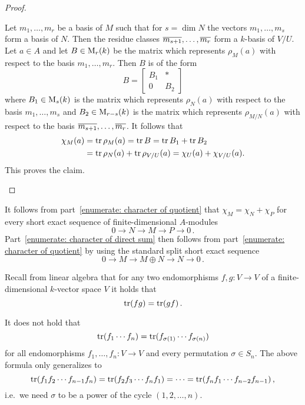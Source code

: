 \begin{proof}
\begin{enumerate}
      Let $m_1, \dotsc, m_r$ be a basis of $M$ such that for $s = \dim N$ the vectors $m_1, \dotsc, m_s$ form a basis of $N$.
      Then the residue classes $\overline{m_{s+1}}, \dotsc, \overline{m_r}$ form a $k$-basis of $V/U$.
      Let $a \in A$ and let $B \in \operatorname{M}_r(k)$ be the matrix which represents $\rho_M(a)$ with respect to the basis $m_1, \dotsc, m_r$.
      Then $B$ is of the form
      \[
          B
        = \begin{bmatrix}
            B_1 & * \\
            0 & B_2
          \end{bmatrix}
      \]
      where $B_1 \in \operatorname{M}_s(k)$ is the matrix which represents $\rho_N(a)$ with respect to the basis $m_1, \dotsc, m_s$ and $B_2 \in \operatorname{M}_{r-s}(k)$ is the matrix which represents $\rho_{M/N}(a)$ with respect to the basis $\overline{m_{s+1}}, \dotsc, \overline{m_r}$.
      It follows that
      \begin{align*}
            \chi_M(a)
        &=  \operatorname{tr} \rho_M(a)
         =  \operatorname{tr} B
         =  \operatorname{tr} B_1 + \operatorname{tr} B_2 \\
        &=  \operatorname{tr} \rho_N(a) + \operatorname{tr} \rho_{V/U}(a)
         =  \chi_U(a) + \chi_{V/U}(a).
      \end{align*}
      This proves the claim.
    \qedhere
  \end{enumerate}
\end{proof}


\begin{remark}
  It follows from part~\ref*{enumerate: character of quotient} that $\chi_M = \chi_N + \chi_P$ for every short exact sequence of finite-dimensional $A$-modules
  \[
        0
    \to N
    \to M
    \to P
    \to 0 \,.
  \]
  Part~\ref*{enumerate: character of direct sum} then follows from part~\ref*{enumerate: character of quotient} by using the standard split short exact sequence
  \[
        0
    \to M
    \to M \oplus N
    \to N
    \to 0 \,.
  \]
\end{remark}


\begin{recall}
  Recall from linear algebra that for any two endomorphisms $f, g \colon V \to V$ of a finite-dimensional $k$-vector space $V$ it holds that
  \[
    \operatorname{tr}(fg) = \operatorname{tr}(gf) \,.
  \]
\end{recall}


\begin{warning}
  It does not hold that
  \[
      \operatorname{tr}(f_1 \dotsm f_n)
    = \operatorname{tr}(f_{\sigma(1)} \dotsm f_{\sigma(n)})
  \]
  for all endomorphisms $f_1, \dotsc, f_n \colon V \to V$ and every permutation $\sigma \in S_n$.
  The above formula only generalizes to
  \[
      \operatorname{tr}(f_1 f_2 \dotsm f_{n-1} f_n)
    = \operatorname{tr}(f_2 f_3 \dotsm f_n f_1)
    = \dotsb
    = \operatorname{tr}(f_n f_1 \dotsm f_{n-2} f_{n-1}) \,,
  \]
  i.e.\ we need $\sigma$ to be a power of the cycle $(1,2,\dotsc,n)$.
\end{warning}


